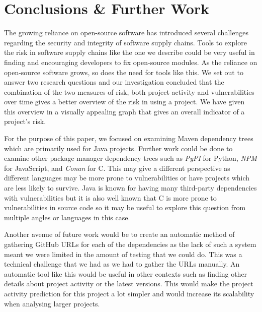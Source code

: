 \documentclass[conference]{IEEEtran}
\begin{document}
{\section{Conclusions \& Further Work}
The growing reliance on open-source software has introduced several challenges regarding the security and integrity of software supply chains. Tools to explore the risk in software supply chains like the one we describe could be very useful in finding and encouraging developers to fix open-source modules. As the reliance on open-source software grows, so does the need for tools like this. We set out to answer two research questions and our investigation concluded that the combination of the two measures of risk, both project activity and vulnerabilities over time gives a better overview of the risk in using a project. We have given this overview in a visually appealing graph that gives an overall indicator of a project's risk. 

For the purpose of this paper, we focused on examining Maven dependency trees which are primarily used for Java projects. Further work could be done to examine other package manager dependency trees such as \textit{PyPI} for Python, \textit{NPM} for JavaScript, and \textit{Conan} for C. This may give a different perspective as different languages may be more prone to vulnerabilities or have projects which are less likely to survive. Java is known for having many third-party dependencies with vulnerabilities but it is also well known that C is more prone to vulnerabilities in source code so it may be useful to explore this question from multiple angles or languages in this case. 

Another avenue of future work would be to create an automatic method of gathering GitHub URLs for each of the dependencies as the lack of such a system meant we were limited in the amount of testing that we could do. This was a technical challenge that we had as we had to gather the URLs manually. An automatic tool like this would be useful in other contexts such as finding other details about project activity or the latest versions. This would make the project activity prediction for this project a lot simpler and would increase its scalability when analysing larger projects. 

}
\end{document}
